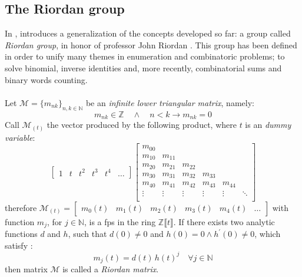 
\subsection{The Riordan group}

In \cite{shapiro:1991}, \citeauthor{shapiro:1991} introduces a
generalization of the concepts developed so far: a group called 
\emph{Riordan group}, in honor of professor John Riordan
.
This group has been defined in order to unify many themes in 
enumeration and combinatoric problems; to solve binomial, 
inverse identities and, more recently, combinatorial
sums and binary words counting. 
\\\\
Let $\mathcal{M}=\lbrace m_{nk}\rbrace_{n,k\in\mathbb{N}}$ be an \emph{infinite
lower triangular matrix}, namely:
\begin{displaymath}
     m_{nk}\in\mathbb{Z} \quad\wedge\quad n < k \rightarrow m_{nk} = 0
\end{displaymath}
Call $\mathcal{M}_{(t)}$ the vector produced by the following product, 
where $t$ is an \emph{dummy variable}:
\begin{displaymath}
    \left[
        \begin{array}{cccccc}
            1 & t & t^{2} & t^{3} & t^{4} &\ldots
        \end{array}
    \right]
    \left[
        \begin{array}{cccccc}
            m_{00} & & & &  &\\
            m_{10} & m_{11} & & &  &\\
            m_{20} & m_{21}& m_{22}& &  &\\
            m_{30} & m_{31}& m_{32}& m_{33}&  &\\
            m_{40} & m_{41}& m_{42}& m_{43}& m_{44} &\\
            \vdots & \vdots& \vdots& \vdots& \vdots & \ddots\\
        \end{array}
    \right]
\end{displaymath}
therefore $\mathcal{M}_{(t)} =
    \left[
        \begin{array}{cccccc}
            m_{0}(t) & m_{1}(t) & m_{2}(t) & m_{3}(t) &m_{4}(t) & \ldots
        \end{array}
    \right]$ 
with function $m_{j}$, for $j\in\mathbb{N}$, is a \ac{fps} in the ring 
$\mathbb{Z}\llbracket t \rrbracket$. If there exists two analytic functions $d$
and $h$, such that $d(0)\neq0$ and $h(0)=0 \wedge h^{\prime}(0)\neq0$, which
satisfy :
\begin{displaymath}
    m_{j}(t)=d(t)\,h(t)^{j} \quad \forall j\in\mathbb{N}
\end{displaymath}
then matrix $\mathcal{M}$ is called a \emph{Riordan matrix}.

